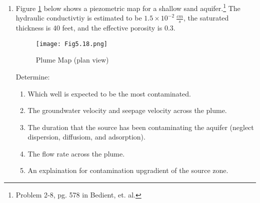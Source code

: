 \documentclass[12pt]{article}
\begin{document}
\begin{enumerate}
\clearpage

\item Figure \ref{fig:plumemap} below shows a piezometric map for a shallow sand aquifer.\footnote{Problem 2-8, pg. 578 in Bedient, et. al.}  The hydraulic conductivtiy is estimated to be $1.5 \times 10^{-2}~\frac{cm}{s}$, the saturated thickness is 40 feet, and the effective porosity is 0.3.

\begin{figure}[h!] %
   \centering
   \texttt{[image: Fig5.18.png]} 
   \caption{Plume Map (plan view)}
   \label{fig:plumemap}
\end{figure}

Determine:
\begin{enumerate}
\item Which well is expected to be the most contaminated.
\item The groundwater velocity and seepage velocity across the plume.
\item The duration that the source has been contaminating the aquifer (neglect dispersion, diffusiom, and adsorption).
\item The flow rate across the plume.
\item An explaination for contamination upgradient of the source zone.
\end{enumerate}

\end{enumerate}
\end{document}
